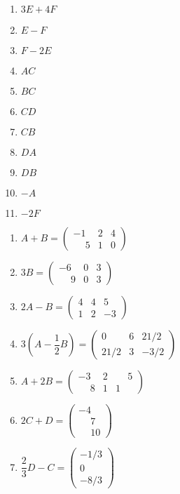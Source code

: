 \documentclass[12pt]{exam}
\begin{document}
\begin{exercicio}
\begin{multicols}{3}
\begin{enumerate}[label={\alph*})]
            \item $3E + 4F$
            \item $E - F$
            \item $F - 2E$
            \item $AC$
            \item $BC$
            \item $CD$
            \item $CB$
            \item $DA$
            \item $DB$
            \item $-A$
            \item $-2F$
        \end{enumerate}
    \end{multicols}
  \begin{solucao}
    \begin{enumerate}[label={\alph*})]
        \item $A + B = \begin{pmatrix} -1 & 2 & 4\\\phantom{-} 5 & 1 & 0\end{pmatrix}$
        \item $3B = \begin{pmatrix} -6 & 0 & 3\\\phantom{-} 9 & 0 & 3\end{pmatrix}$
        \item $2A - B = \begin{pmatrix} 4 & 4 & 5\\1 & 2 & -3\end{pmatrix}$
        \item $3(A - \dfrac{1}{2}B) = \begin{pmatrix} 0 & 6 & 21/2\\21/2 & 3 & -3/2\end{pmatrix}$
        \item $A + 2B = \begin{pmatrix} -3 & 2 & \phantom{-} 5\\\phantom{-} 8 & 1 & 1\end{pmatrix}$
        \item $2C + D = \begin{pmatrix} -4\\ \phantom{-} 7\\ \phantom{-} 10\end{pmatrix}$
        \item $\dfrac{2}{3}D - C = \begin{pmatrix} -1/3\\ 0\\ -8/3\end{pmatrix}$

\end{enumerate}
\end{solucao}
\end{exercicio}
\end{document}
